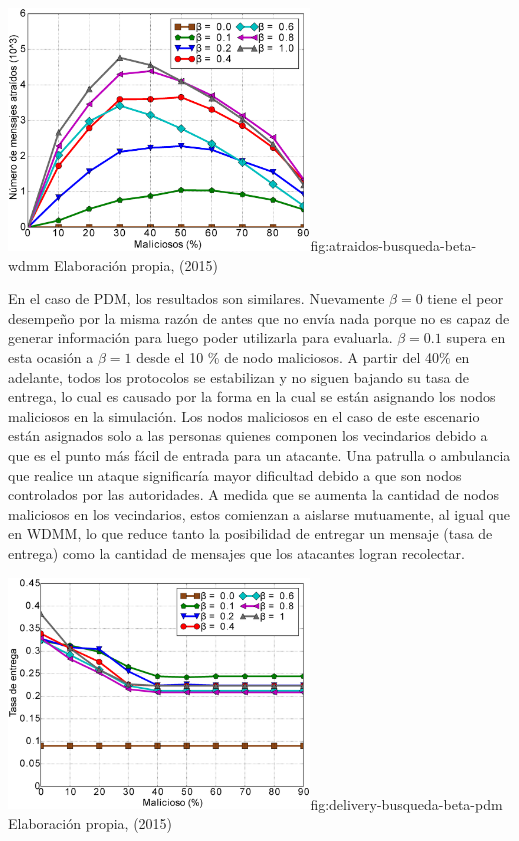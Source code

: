 {\includegraphics[width=0.6\textwidth]{imagenes/seguridad/graficos/atraidos_busqueda_beta.eps}}{fig:atraidos-busqueda-beta-wdmm}
{Elaboración propia, (2015)}



En el caso de PDM, los resultados son similares. Nuevamente $\beta = 0$ tiene el
peor desempeño por la misma razón de antes que no envía nada porque no es capaz
de generar información para luego poder utilizarla para evaluarla. $\beta =
0.1$ supera en esta ocasión a $\beta = 1$ desde el 10 \% de nodo maliciosos. A
partir del 40\% en adelante, todos los protocolos se estabilizan y no siguen
bajando su tasa de entrega, lo cual es causado por la forma en la cual se están
asignando los nodos maliciosos en la simulación. Los nodos maliciosos en el caso
de este escenario están asignados solo a las personas quienes componen los
vecindarios debido a que es el punto más fácil de entrada para un atacante. Una
patrulla o ambulancia que realice un ataque significaría mayor dificultad debido
a que son nodos controlados por las autoridades. A medida que se aumenta la
cantidad de nodos maliciosos en los vecindarios, estos comienzan a aislarse
mutuamente, al igual que en WDMM, lo que reduce tanto la posibilidad de entregar
un mensaje (tasa de entrega) como la cantidad de mensajes que los atacantes
logran recolectar.




{\includegraphics[width=0.6\textwidth]{imagenes/seguridad/graficos/delivery_pdm_ebr.eps}}{fig:delivery-busqueda-beta-pdm}
{Elaboración propia, (2015)}

